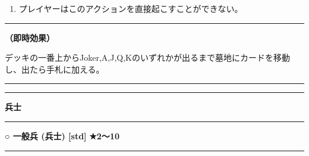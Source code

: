 \documentclass[twocolumn,a5paper,papersize,10pt]{jarticle}
\begin{document}
\vspace{-1zh}%
\begin{enumerate}
\renewcommand{\labelenumi}{※}
\setlength{\leftskip}{-0.3cm}
\setlength{\itemsep}{0pt} %
\setlength{\parskip}{0pt} %

\item プレイヤーはこのアクションを直接起こすことができない。

\vspace{-3mm}%
\end{enumerate}
\vspace{1mm}%
\hrule height 0.1mm depth 0mm width 66.5mm %
\vspace{1mm}%

{\bf（即時効果）}

デッキの一番上からJoker,A,J,Q,Kのいずれかが出るまで墓地にカードを移動し、出たら手札に加える。


\begin{center}
\begin{center}
\hrule height 1mm depth 0mm width 66.5mm %
\vspace{1mm}%
{\Large\bf {}}
\vspace{1mm}%
\hrule height 0.5mm depth 0mm width 66.5mm %
\end{center}
\end{center}
\vspace{-1zh}%


\begin{tcolorbox}
{\scriptsize\bf 兵士}
\end{tcolorbox}
\vspace{-1zh}%
\vspace{2mm} %
\hrule height 0.5mm depth 0mm width 66.5mm %
\vspace{1mm} %
{\small\bf ○ 一般兵 {\scriptsize (兵士) [std]}} %
\hfill 
{\footnotesize\bf ★2〜10 }

\vspace{1mm}%
\hrule height 0.1mm depth 0mm width 66.5mm %
\vspace{1mm}%
\end{document}
